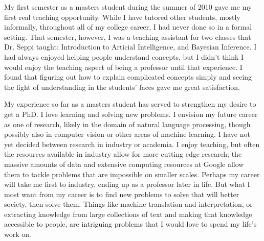\documentclass[onecolumn, 12pt]{article}
\begin{document}
My first semester as a masters student during the summer of 2010 gave me my
first real teaching opportunity.  While I have tutored other students, mostly
informally, throughout all of my college career, I had never done so in a
formal setting.  That semester, however, I was a teaching assistant for two
classes that Dr. Seppi taught: Introduction to Articial Intelligence, and
Bayesian Inference.  I had always enjoyed helping people understand concepts,
but I didn't think I would enjoy the teaching aspect of being a professor until
that experience.  I found that figuring out how to explain complicated concepts
simply and seeing the light of understanding in the students' faces gave me
great satisfaction.

My experience so far as a masters student has served to strengthen my desire to
get a PhD.  I love learning and solving new problems.  I envision my future
career as one of research, likely in the domain of natural language processing,
though possibly also in computer vision or other areas of machine learning.  I
have not yet decided between research in industry or academia.  I enjoy
teaching, but often the resources available in industry allow for more cutting
edge research; the massive amounts of data and extensive computing resources at
Google allow them to tackle problems that are impossible on smaller scales.
Perhaps my career will take me first to industry, ending up as a professor
later in life.  But what I most want from my career is to find new problems to
solve that will better society, then solve them.  Things like machine
translation and interpretation, or extracting knowledge from large collections
of text and making that knowledge accessible to people, are intriguing problems
that I would love to spend my life's work on.
\end{document}
